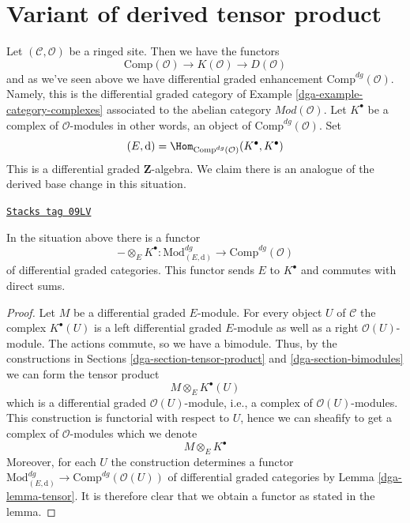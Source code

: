 \section{Variant of derived tensor product}
\label{dga-section-variant-base-change}
Let $(\mathcal{C}, \mathcal{O})$ be a ringed site. Then we have the functors
$$
\text{Comp}(\mathcal{O}) \to K(\mathcal{O}) \to D(\mathcal{O})
$$
and as we've seen above we have differential graded enhancement
$\text{Comp}^{dg}(\mathcal{O})$. Namely, this is the differential
graded category of Example \ref{dga-example-category-complexes} associated
to the abelian category $\textit{Mod}(\mathcal{O})$.
Let $K^\bullet$ be a complex of $\mathcal{O}$-modules in other
words, an object of $\text{Comp}^{dg}(\mathcal{O})$. Set
$$
(E, \text{d}) =
\Hom_{\text{Comp}^{dg}(\mathcal{O})}(K^\bullet, K^\bullet)
$$
This is a differential graded $\mathbf{Z}$-algebra. We claim there is
an analogue of the derived base change in this situation.

\begin{lemma}
\label{dga-lemma-tensor-with-complex}
\href{https://stacks.math.columbia.edu/tag/09LV}{\texttt{Stacks tag 09LV}}

In the situation above there is a functor
$$
- \otimes_E K^\bullet :
\text{Mod}^{dg}_{(E, \text{d})}
\longrightarrow
\text{Comp}^{dg}(\mathcal{O})
$$
of differential graded categories. This functor sends $E$ to $K^\bullet$
and commutes with direct sums.
\end{lemma}

\begin{proof}

Let $M$ be a differential graded $E$-module. For every object $U$ of
$\mathcal{C}$ the complex $K^\bullet(U)$ is a left differential
graded $E$-module as well as a right $\mathcal{O}(U)$-module.
The actions commute, so we have a bimodule.
Thus, by the constructions in
Sections \ref{dga-section-tensor-product} and \ref{dga-section-bimodules}
we can form the tensor product
$$
M \otimes_E K^\bullet(U)
$$
which is a differential graded $\mathcal{O}(U)$-module, i.e., a complex
of $\mathcal{O}(U)$-modules. This construction is functorial with respect
to $U$, hence we can sheafify to get a complex of $\mathcal{O}$-modules
which we denote
$$
M \otimes_E K^\bullet
$$
Moreover, for each $U$ the construction determines a functor
$\text{Mod}^{dg}_{(E, \text{d})} \to \text{Comp}^{dg}(\mathcal{O}(U))$
of differential graded categories by Lemma \ref{dga-lemma-tensor}.
It is therefore clear that we obtain a functor as stated in the lemma.
\end{proof}

